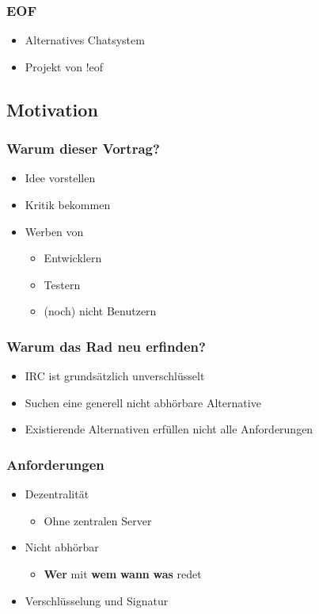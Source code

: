 \documentclass{beamer}
\begin{document}
\frame
{
  \frametitle{EOF}

  \begin{itemize}
  \item Alternatives Chatsystem
  \pause
  \item Projekt von !eof
  \end{itemize}
}

\subsection{Motivation}
\frame
{
  \frametitle{Warum dieser Vortrag?}

  \begin{itemize}
  \item Idee vorstellen
  \pause
  \item Kritik bekommen
  \pause
  \item Werben von
  \pause
  \begin{itemize}
  \item Entwicklern
  \pause
  \item Testern
  \pause
  \item (noch) nicht Benutzern
  \end{itemize}
  \end{itemize}
}
\frame
{
  \frametitle{Warum das Rad neu erfinden?}

  \begin{itemize}
  \item IRC ist grunds\"atzlich unverschl\"usselt
  \pause
  \item Suchen eine generell nicht abh\"orbare Alternative
  \pause
  \item Existierende Alternativen erf\"ullen nicht alle Anforderungen
  \end{itemize}
}
\frame
{
  \frametitle{Anforderungen}

  \begin{itemize}
  \item Dezentralit\"at
  \pause
  \begin{itemize}
  \item Ohne zentralen Server
  \pause
  \end{itemize}
  \item Nicht abh\"orbar
  \pause
  \begin{itemize}
  \item \textbf{Wer} mit \textbf{wem} \textbf{wann} \textbf{was} redet
  \pause
  \end{itemize}
  \item Verschl\"usselung und Signatur
  \end{itemize}
}
\end{document}
